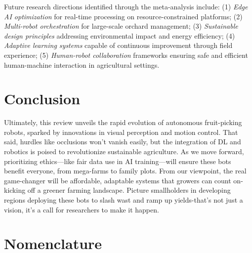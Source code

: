 \documentclass[a4paper,fleqn]{cas-dc}
\begin{document}
Future research directions identified through the meta-analysis include: (1) \textit{Edge AI optimization} for real-time processing on resource-constrained platforms; (2) \textit{Multi-robot orchestration} for large-scale orchard management; (3) \textit{Sustainable design principles} addressing environmental impact and energy efficiency; (4) \textit{Adaptive learning systems} capable of continuous improvement through field experience; (5) \textit{Human-robot collaboration} frameworks ensuring safe and efficient human-machine interaction in agricultural settings.

\section{Conclusion}
Ultimately, this review unveils the rapid evolution of autonomous fruit-picking robots, sparked by innovations in visual perception and motion control. That said, hurdles like occlusions won't vanish easily, but the integration of DL and robotics is poised to revolutionize sustainable agriculture.  As we move forward, prioritizing ethics—like fair data use in AI training—will ensure these bots benefit everyone, from mega-farms to family plots. From our viewpoint, the real game-changer will be affordable, adaptable systems that growers can count on-kicking off a greener farming landscape. Picture smallholders in developing regions deploying these bots to slash wast and ramp up yields-that's not just a vision, it's a call for researchers to make it happen. 

\section*{Nomenclature}\label{nomenclature} 
\end{document}
